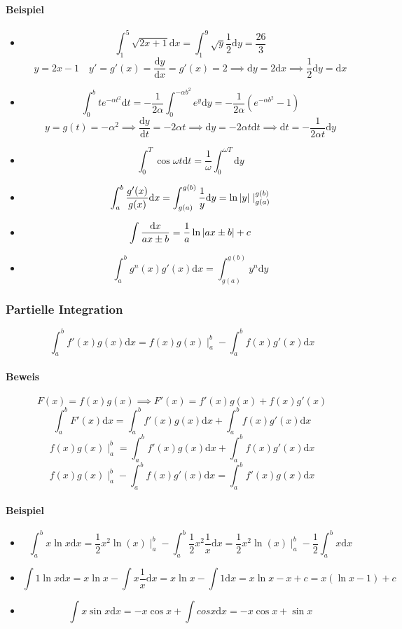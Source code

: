 \documentclass[a4paper]{scrartcl}
\DeclarePairedDelimiter\abs{\lvert}{\rvert}%
\begin{document}
\paragraph{Beispiel}
\label{sec-11-3-2-2}
\begin{itemize}
\item \[\int_1^5\sqrt{2x+1}\mathrm{d}x = \int_1^9\sqrt{y}\frac{1}{2}\mathrm{d}y=\frac{26}{3}\]
           \[y=2x-1\quad y'=g'(x) =\frac{\mathrm{d}y}{\mathrm{d}x} = g'(x) = 2 \implies \mathrm{d}y = 2\mathrm{d}x \implies \frac{1}{2}\mathrm{d}y = \mathrm{d}x\]
\item \[\int_0^b t e^{-\alpha t^2}\mathrm{d}t = -\frac{1}{2\alpha}\int_0^{-\alpha b^2} e^y\mathrm{d}y = -\frac{1}{2\alpha}(e^{-\alpha b^2} - 1)\]
           \[y=g(t)=-\alpha ^2 \implies \frac{\mathrm{d}y}{\mathrm{d}t}=-2\alpha t \implies \mathrm{d}y=-2\alpha t \mathrm{d}t \implies \mathrm{d}t = -\frac{1}{2\alpha t}\mathrm{d}y\]
\item \[\int_0^T \cos{\omega t}\mathrm{d}t = \frac{1}{\omega}\int_0^{\omega T}\mathrm{d}y\]
\item \[\int_a^b \frac{g'(x)}{g(x)}\mathrm{d}x = \int_{g(a)}^{g(b)}\frac{1}{y}\mathrm{d}y=\ln{\abs{y}}\mid_{g(a)}^{g(b)}\]
\item \[\int \frac{\mathrm{d}x}{ax\pm b} = \frac{1}{a}\ln{\abs{ax\pm b}} + c\]
\item \[\int_a^b g^n(x)g'(x)\mathrm{d}x = \int_{g(a)}^{g(b)} y^n\mathrm{d}y\]
\end{itemize}
\subsubsection{Partielle Integration}
\label{sec-11-3-3}
\[\int_a^b f'(x)g(x)\mathrm{d}x = f(x)g(x)\mid_a^b - \int_a^b f(x)g'(x)\mathrm{d}x\]
\paragraph{Beweis}
\label{sec-11-3-3-1}
\[F(x)=f(x)g(x)\implies F'(x) = f'(x)g(x) + f(x)g'(x)\]
\[\int_a^b F'(x)\mathrm{d}x = \int_a^b f'(x)g(x)\mathrm{d}x + \int_a^b f(x)g'(x)\mathrm{d}x\]
\[f(x)g(x)\mid_a^b = \int_a^b f'(x)g(x)\mathrm{d}x + \int_a^b f(x)g'(x)\mathrm{d}x\]
\[f(x)g(x)\mid_a^b - \int_a^b f(x)g'(x)\mathrm{d}x = \int_a^b f'(x)g(x)\mathrm{d}x\]
\paragraph{Beispiel}
\label{sec-11-3-3-2}
\begin{itemize}
\item \[\int_a^b x\ln{x}\mathrm{d}x = \frac{1}{2}x^2\ln(x)\mid_a^b - \int_a^b \frac{1}{2}x^2 \frac{1}{x}\mathrm{d}x = \frac{1}{2}x^2\ln(x)\mid_a^b - \frac{1}{2}\int_a^b x\mathrm{d}x\]
\item \[\int 1\ln{x}\mathrm{d}x = x\ln{x} - \int x\frac{1}{x}\mathrm{d}x = x\ln{x} - \int 1\mathrm{d}x = x\ln{x}-x+c=x(\ln{x}-1)+c\]
\item \[\int x\sin{x}\mathrm{d}x=-x\cos{x} + \int cos{x}\mathrm{d}x = -x\cos{x}+\sin{x}\]
\end{itemize}
\end{document}
